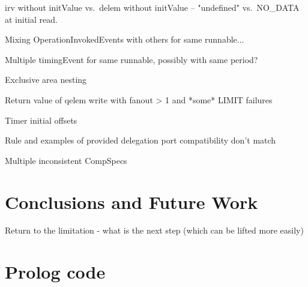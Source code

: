\documentclass[twocolumn]{article}
\begin{document}
irv without initValue vs.\ delem without initValue -- "undefined" vs.\ NO\_DATA at initial read.

Mixing OperationInvokedEvents with others for same runnable...

Multiple timingEvent for same runnable, possibly with same period?

Exclusive area nesting

Return value of qelem write with fanout > 1 and *some* LIMIT failures

Timer initial offsets

Rule and examples of provided delegation port compatibility don't match

Multiple inconsistent CompSpecs


\section{Conclusions and Future Work}
\label{sec:Conc}

Return to the limitation - what is the next step (which can be lifted more easily)

\onecolumn
\appendix
\section{Prolog code}
\label{sec:Prolog}





% 
\end{document}
